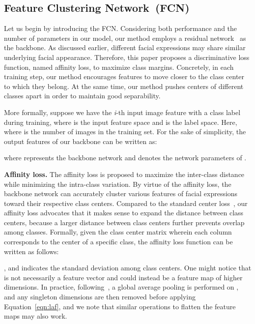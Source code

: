 \documentclass{article}
\begin{document}
\subsection{Feature Clustering Network~(FCN)}
Let us begin by introducing the FCN. Considering both performance and the number of parameters in our model, our method employs a residual network~\cite{he2016deep} as the backbone. As discussed earlier, different facial expressions may share similar underlying facial appearance. Therefore, this paper proposes a discriminative loss function, named affinity loss, to maximize class margins. Concretely, in each training step, our method encourages features to move closer to the class center to which they belong.
At the same time, our method pushes centers of different classes apart in order to maintain good separability.

More formally, {suppose we have the \textit{i}-th input image feature  with a class label  during training, where  is the input feature space and  is the label space. Here,  where  is the number of images in the training set.} For the sake of simplicity, the output features of our backbone can be written as: 

\noindent where  represents the backbone network and  denotes the network parameters of .


\noindent\textbf{{Affinity loss.}} The affinity loss is proposed to maximize the inter-class distance while minimizing the intra-class variation. By virtue of the affinity loss,
the backbone network can accurately cluster various features of facial expressions toward their respective class centers.
Compared to the standard center loss~\cite{wen2016discriminative}, our affinity loss advocates that it makes sense to expand the distance between class centers, because a larger distance between class centers further prevents overlap among classes. Formally, {given the class center matrix  wherein each column corresponds to the center of a specific class}, the affinity loss function can be written as follows:

, and  indicates the standard deviation among class centers. {One might notice that  is not necessarily a feature vector and could instead be a feature map of higher dimensions. In practice, following}~\cite{wen2016discriminative}{, a global average pooling is performed on , and any singleton dimensions are then removed before applying Equation}~\ref{eqn:laf}, and we note that similar operations to flatten the feature maps may also work.
\end{document}
